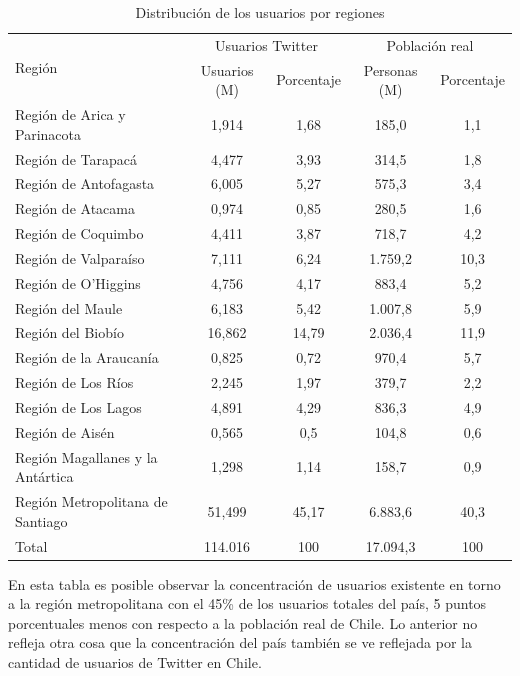 
\begin{table}[H]
	\centering
	\begin{tabular}{| p{5.5cm} | c | c | c | c |}
		\hline
			\multirow{2}{*}{Región} & \multicolumn{2}{c|}{Usuarios Twitter} & \multicolumn{2}{c|}{Población real} \\ \cline{2-5}
			& Usuarios (M) & Porcentaje & Personas (M) & Porcentaje \\ \hline
			Región de Arica y Parinacota & 1,914 & 1,68 & 185,0 & 1,1 \\ \hline 
			Región de Tarapacá & 4,477 & 3,93 & 314,5 & 1,8 \\ \hline 
			Región de Antofagasta & 6,005 & 5,27 & 575,3 & 3,4 \\ \hline 
			Región de Atacama & 0,974 & 0,85 & 280,5 & 1,6 \\ \hline 
			Región de Coquimbo & 4,411 & 3,87 & 718,7 & 4,2 \\ \hline 
			Región de Valparaíso & 7,111 & 6,24 & 1.759,2 & 10,3 \\ \hline
			Región de O’Higgins & 4,756 & 4,17 & 883,4 & 5,2 \\ \hline 
			Región del Maule & 6,183 & 5,42 & 1.007,8 & 5,9 \\ \hline 
			Región del Biobío & 16,862 & 14,79 & 2.036,4 & 11,9\\ \hline 
			Región de la Araucanía & 0,825 & 0,72 & 970,4 & 5,7 \\ \hline 
			Región de Los Ríos & 2,245 & 1,97 & 379,7 & 2,2 \\ \hline 
			Región de Los Lagos & 4,891 & 4,29 & 836,3 & 4,9 \\ \hline
			Región de Aisén & 0,565 & 0,5 & 104,8 & 0,6 \\ \hline
			Región Magallanes y la Antártica & 1,298 & 1,14 & 158,7 & 0,9 \\ \hline  
			Región Metropolitana de Santiago & 51,499 & 45,17 & 6.883,6 & 40,3\\ \hline 
			Total & 114.016 & 100 & 17.094,3 & 100\\ \hline 
	\end{tabular}
	\caption {Distribución de los usuarios por regiones}
	\label{table:cantidad_usuarios_por_region}
	
\end{table}

En esta tabla es posible observar la concentración de usuarios existente en torno a la región metropolitana con el 45\% de los usuarios totales del país, 5 puntos porcentuales menos con respecto a la población real de Chile. Lo anterior no refleja otra cosa que la concentración del país también se ve reflejada por la cantidad de usuarios de Twitter en Chile.
